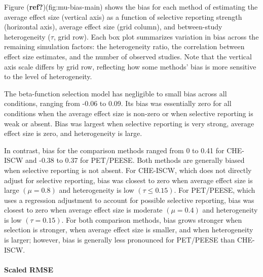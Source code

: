 \documentclass[
]{article}
\begin{document}
Figure (\textbf{ref?})(fig:mu-bias-main) shows the bias for each method
of estimating the average effect size (vertical axis) as a function of
selective reporting strength (horizontal axis), average effect size
(grid column), and between-study heterogeneity (\(\tau\), grid row).
Each box plot summarizes variation in bias across the remaining
simulation factors: the heterogeneity ratio, the correlation between
effect size estimates, and the number of observed studies. Note that the
vertical axis scale differs by grid row, reflecting how some methods'
bias is more sensitive to the level of heterogeneity.

The beta-function selection model has negligible to small bias across
all conditions, ranging from -0.06 to 0.09. Its bias was essentially
zero for all conditions when the average effect size is non-zero or when
selective reporting is weak or absent. Bias was largest when selective
reporting is very strong, average effect size is zero, and heterogeneity
is large.

In contrast, bias for the comparison methods ranged from 0 to 0.41 for
CHE-ISCW and -0.38 to 0.37 for PET/PEESE. Both methods are generally
biased when selective reporting is not absent. For CHE-ISCW, which does
not directly adjust for selective reporting, bias was closest to zero
when average effect size is large \((\mu = 0.8)\) and heterogeneity is
low \((\tau \leq 0.15)\). For PET/PEESE, which uses a regression
adjustment to account for possible selective reporting, bias was closest
to zero when average effect size is moderate \((\mu = 0.4)\) and
heterogeneity is low \((\tau = 0.15)\). For both comparison methods,
bias grows stronger when selection is stronger, when average effect size
is smaller, and when heterogeneity is larger; however, bias is generally
less pronounced for PET/PEESE than CHE-ISCW.

\paragraph{Scaled RMSE}\label{scaled-rmse}
\end{document}
